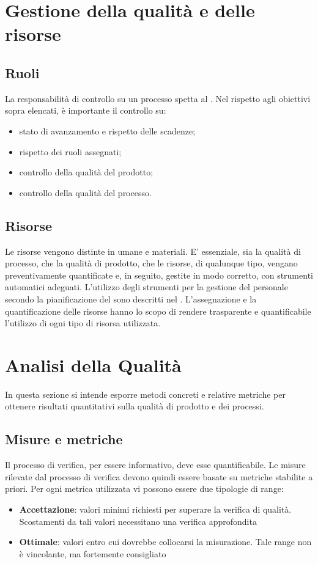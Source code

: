 \documentclass[12pt,a4paper]{article}
\begin{document}
\newpage

\section{Gestione della qualità e delle risorse}
\subsection{Ruoli}
La responsabilità di controllo su un processo spetta al \PM{}. Nel rispetto agli obiettivi sopra elencati, è importante il controllo su:
\begin{itemize}
	\item stato di avanzamento e rispetto delle scadenze;
	\item rispetto dei ruoli assegnati;
	\item controllo della qualità del prodotto;
	\item controllo della qualità del processo. 
\end{itemize}

\subsection{Risorse}
Le risorse vengono distinte in umane e materiali. E' essenziale, sia la qualità di processo, che la qualità di prodotto, che le risorse, di qualunque tipo, vengano preventivamente quantificate e, in seguito, gestite in modo corretto, con strumenti automatici adeguati.
L'utilizzo degli strumenti per la gestione del personale secondo la pianificazione del \PdP{} sono descritti nel \NdP. L'assegnazione e la quantificazione delle risorse hanno lo scopo di rendere trasparente e quantificabile l'utilizzo di ogni tipo di risorsa utilizzata.

\newpage

\section{Analisi della Qualità}\label{analisi}
In questa sezione si intende esporre metodi concreti e relative metriche per ottenere risultati quantitativi sulla qualità di prodotto e dei processi. 

\subsection{Misure e metriche}\label{metriche}
Il processo di verifica, per essere informativo, deve esse quantificabile. Le misure rilevate dal processo di verifica devono quindi essere basate su metriche stabilite a priori. Per ogni metrica utilizzata vi possono essere due tipologie di range:
\begin{itemize}
\item \textbf{Accettazione}: valori minimi richiesti per superare la verifica di qualità. Scostamenti da tali valori necessitano una verifica approfondita
\item \textbf{Ottimale}: valori entro cui dovrebbe collocarsi la misurazione. Tale range non è vincolante, ma fortemente consigliato
\end{itemize}
\end{document}
